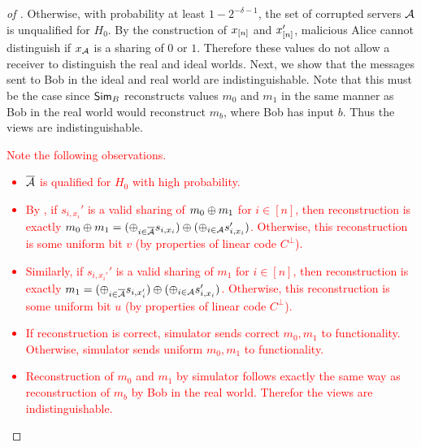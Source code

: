 \begin{proof}[of ]
	Otherwise, with probability at least $1 - 2^{-\delta-1}$, the set of corrupted servers ${\mathcal A}$ is unqualified for $H_0$.
	By the construction of $x_{[n]}$ and $x'_{[n]}$, malicious Alice cannot distinguish if $x_{\mathcal A}$ is a sharing of $0$ or $1$.
	Therefore these values do not allow a receiver to distinguish the real and ideal worlds.
	Next, we show that the messages sent to Bob in the ideal and real world are indistinguishable.
	Note that this must be the case since $\mathsf{Sim}_B$ reconstructs values $m_0$ and $m_1$ in the same manner as Bob in the real world would reconstruct $m_b$, where Bob has input $b$.
	Thus the views are indistinguishable.

	\textcolor{red}{
	Note the following observations.
	\begin{itemize}
		\item $\overline{{\mathcal A}}$ is qualified for $H_0$ with high probability.
		\item By , if $s_{i, x_i}'$ is a valid sharing of $m_0 \oplus m_1$ for $i \in [n]$, then reconstruction is exactly $m_0 \oplus m_1 = (\oplus_{i \in \overline{{\mathcal A}}} s_{i,x_i}) \oplus (\oplus_{i \in {\mathcal A}} s_{i, x_i}' )$.
		Otherwise, this reconstruction is some uniform bit $v$ (by properties of linear code $C^\perp$).
		\item Similarly, if $s_{i, x_i'}'$ is a valid sharing of $m_1$ for $i \in [n]$, then reconstruction is exactly $m_1 = (\oplus_{i \in \overline{{\mathcal A}}} s_{i,x_i'}) \oplus (\oplus_{i \in {\mathcal A}} s_{i, x_i}' )$.
		Otherwise, this reconstruction is some uniform bit $u$ (by properties of linear code $C^\perp$).
		\item If reconstruction is correct, simulator sends correct $m_0, m_1$ to functionality.
		Otherwise, simulator sends uniform $m_0, m_1$ to functionality.
		\item Reconstruction of $m_0$ and $m_1$ by simulator follows exactly the same way as reconstruction of $m_b$ by Bob  in the real world.
		Therefor the views are indistinguishable.
	\end{itemize}
	}
\end{proof}





